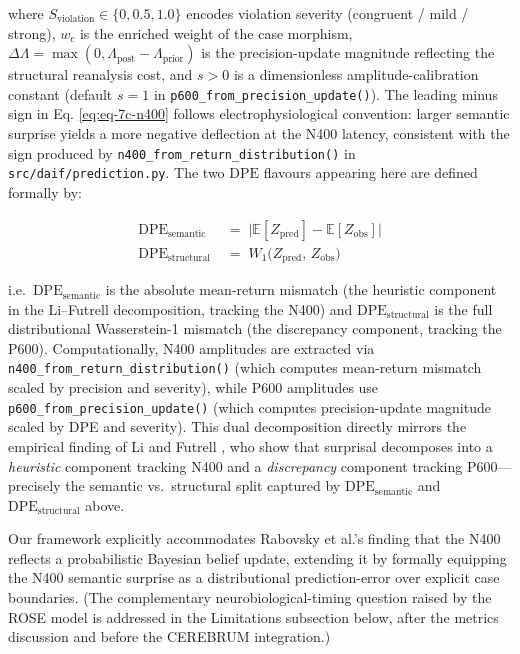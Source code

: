 \documentclass[
]{article}
\begin{document}
where \(S_{\text{violation}} \in \{0, 0.5, 1.0\}\) encodes violation
severity (congruent / mild / strong), \(w_c\) is the enriched weight of
the case morphism,
\(\Delta\Lambda = \max(0, \Lambda_{\text{post}} - \Lambda_{\text{prior}})\)
is the precision-update magnitude reflecting the structural reanalysis
cost, and \(s > 0\) is a dimensionless amplitude-calibration constant
(default \(s=1\) in \texttt{p600\_from\_precision\_update()}). The
leading minus sign in Eq. \ref{eq:eq-7c-n400} follows
electrophysiological convention: larger semantic surprise yields a more
negative deflection at the N400 latency, consistent with the sign
produced by \texttt{n400\_from\_return\_distribution()} in
\texttt{src/daif/prediction.py}. The two \(\mathrm{DPE}\) flavours
appearing here are defined formally by:

\begin{align}
\mathrm{DPE}_{\text{semantic}}\;&=\;\bigl\lvert \mathbb{E}[Z_{\text{pred}}] - \mathbb{E}[Z_{\text{obs}}] \bigr\rvert
\label{eq:eq-7c-dpe-semantic}\\
\mathrm{DPE}_{\text{structural}}\;&=\;W_{1}\bigl(Z_{\text{pred}},\,Z_{\text{obs}}\bigr)
\label{eq:eq-7c-dpe-structural}
\end{align}

i.e.~\(\mathrm{DPE}_{\text{semantic}}\) is the absolute mean-return
mismatch (the heuristic component in the Li--Futrell decomposition,
tracking the N400) and \(\mathrm{DPE}_{\text{structural}}\) is the full
distributional Wasserstein-1 mismatch (the discrepancy component,
tracking the P600). Computationally, N400 amplitudes are extracted via
\texttt{n400\_from\_return\_distribution()} (which computes mean-return
mismatch scaled by precision and severity), while P600 amplitudes use
\texttt{p600\_from\_precision\_update()} (which computes
precision-update magnitude scaled by DPE and severity). This dual
decomposition directly mirrors the empirical finding of Li and Futrell
\citetext{\citeyear{li2023decomposition}; \citeyear{li2024shallow}}, who
show that surprisal decomposes into a \emph{heuristic} component
tracking N400 and a \emph{discrepancy} component tracking
P600---precisely the semantic vs.~structural split captured by
\(\mathrm{DPE}_{\text{semantic}}\) and
\(\mathrm{DPE}_{\text{structural}}\) above.

Our framework explicitly accommodates Rabovsky et al.'s
\citeyearpar{rabovsky2018modelling} finding that the N400 reflects a
probabilistic Bayesian belief update, extending it by formally equipping
the N400 semantic surprise as a distributional prediction-error over
explicit case boundaries. (The complementary neurobiological-timing
question raised by the ROSE model is addressed in the Limitations
subsection below, after the metrics discussion and before the CEREBRUM
integration.)
\end{document}
